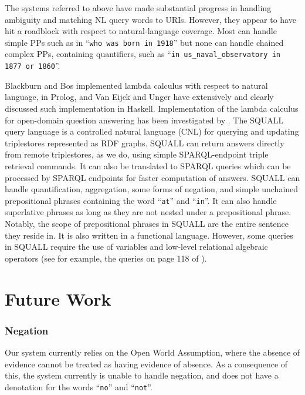 \documentclass[../main.tex]{subfiles}
\begin{document}
\begin{refsection}
The systems referred to above have made substantial progress in handling ambiguity and matching NL query words to URIs. However, they appear to have hit a roadblock with respect to natural-language coverage. Most can handle simple PPs such as in ``\texttt{who was born in 1918}'' but none can handle chained complex PPs, containing quantifiers, such as ``\texttt{in us\_naval\_observatory in 1877 or 1860}''.

Blackburn and Bos \cite{blackburn2005representation} implemented lambda calculus with respect to natural language, in
Prolog, and Van Eijck and Unger \cite{van2010computational} have extensively and clearly discussed such implementation in
Haskell. Implementation of the lambda calculus for open-domain question answering has been
investigated by \cite{ahn2005question}.
The SQUALL query language \cite{ferre:squall,ferre2013squall} is a controlled natural language
(CNL) for querying and updating triplestores represented as RDF graphs. SQUALL can return
answers directly from remote triplestores, as we do, using simple SPARQL-endpoint triple
retrieval commands. It can also be translated to SPARQL queries which can be processed by
SPARQL endpoints for faster computation of answers. SQUALL can handle
quantification, aggregation, some forms of negation, and simple unchained prepositional phrases containing the word ``\texttt{at}'' and ``\texttt{in}''.  It can also handle superlative phrases as long as they are not nested under a prepositional phrase.  Notably, the scope of prepositional phrases in SQUALL are the entire sentence they reside in.
It is also written in a functional language. However, some queries in SQUALL require the use of variables and low-level relational algebraic operators (see for example, the queries on page 118
of \cite{ferre2013squall}).

\section{Future Work}
\label{webist2019journal:futurework}

\subsubsection{Negation}
Our system currently relies on the Open World Assumption, where the absence of evidence cannot be treated as having evidence of absence.  As a consequence of this, the system currently is unable to handle negation, and does not have a denotation for the words ``\texttt{no}'' and ``\texttt{not}''.


\end{refsection}
\end{document}
